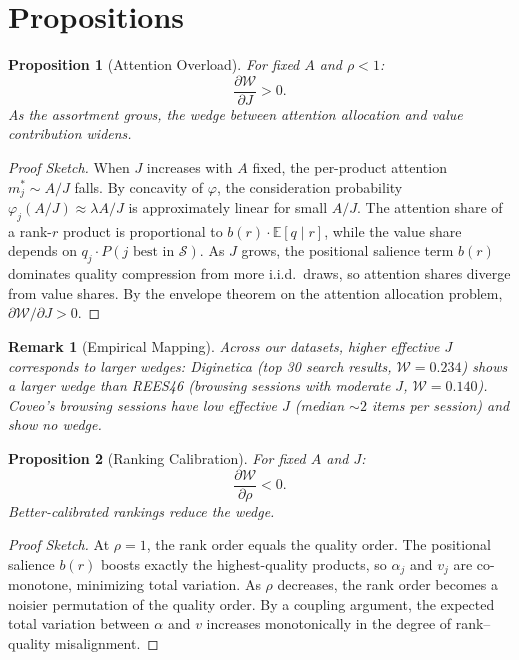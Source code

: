 \documentclass[12pt]{article}
\newtheorem{proposition}{Proposition}
\newtheorem{remark}{Remark}
\begin{document}
\section{Propositions}\label{sec:propositions}

\begin{proposition}[Attention Overload]\label{prop:overload}
For fixed $A$ and $\rho < 1$:
\begin{equation}
    \frac{\partial \mathcal{W}}{\partial J} > 0.
\end{equation}
As the assortment grows, the wedge between attention allocation and value contribution widens.
\end{proposition}

\begin{proof}[Proof Sketch]
When $J$ increases with $A$ fixed, the per-product attention $m_j^* \sim A/J$ falls. By concavity of $\varphi$, the consideration probability $\varphi_j(A/J) \approx \lambda A/J$ is approximately linear for small $A/J$. The attention share of a rank-$r$ product is proportional to $b(r) \cdot \mathbb{E}[q \mid r]$, while the value share depends on $q_j \cdot P(j \text{ best in } \mathcal{S})$. As $J$ grows, the positional salience term $b(r)$ dominates quality compression from more i.i.d.\ draws, so attention shares diverge from value shares. By the envelope theorem on the attention allocation problem, $\partial \mathcal{W}/\partial J > 0$.
\end{proof}

\begin{remark}[Empirical Mapping]
Across our datasets, higher effective $J$ corresponds to larger wedges: Diginetica (top 30 search results, $\mathcal{W} = 0.234$) shows a larger wedge than REES46 (browsing sessions with moderate $J$, $\mathcal{W} = 0.140$). Coveo's browsing sessions have low effective $J$ (median $\sim 2$ items per session) and show no wedge.
\end{remark}

\begin{proposition}[Ranking Calibration]\label{prop:calibration}
For fixed $A$ and $J$:
\begin{equation}
    \frac{\partial \mathcal{W}}{\partial \rho} < 0.
\end{equation}
Better-calibrated rankings reduce the wedge.
\end{proposition}

\begin{proof}[Proof Sketch]
At $\rho = 1$, the rank order equals the quality order. The positional salience $b(r)$ boosts exactly the highest-quality products, so $\alpha_j$ and $v_j$ are co-monotone, minimizing total variation. As $\rho$ decreases, the rank order becomes a noisier permutation of the quality order. By a coupling argument, the expected total variation between $\alpha$ and $v$ increases monotonically in the degree of rank--quality misalignment.
\end{proof}
\end{document}
